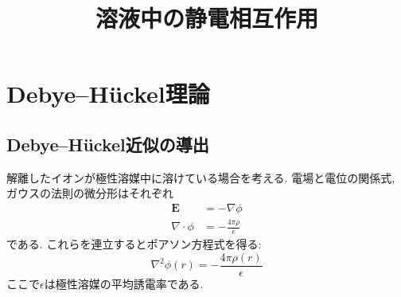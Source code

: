 





\title{溶液中の静電相互作用}
\maketitle

\section{Debye--H\"{u}ckel理論}
\subsection{Debye--H\"{u}ckel近似の導出}
解離したイオンが極性溶媒中に溶けている場合を考える.
電場と電位の関係式, ガウスの法則の微分形はそれぞれ
\begin{align}
    \bm{E} &= - \nabla \phi
    \\
    \nabla \cdot \phi &= - \frac{4\pi\rho}{\epsilon}
\end{align}
である. これらを連立するとポアソン方程式を得る:
\begin{equation}
    \nabla^{2} \phi(r) = - \frac{4\pi\rho(r)}{\epsilon}
    \label{Eq:Poisson-Equation}
\end{equation}
ここで$\epsilon$は極性溶媒の平均誘電率である.

